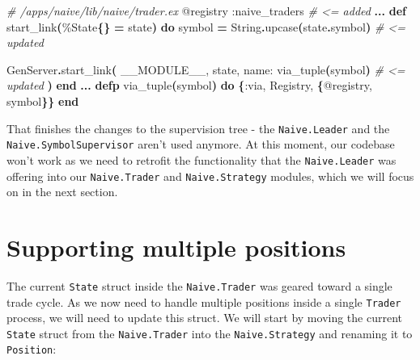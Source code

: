 \documentclass[
  oneside]{book}
\newenvironment{Shaded}{\begin{snugshade}}{\end{snugshade}}
\newcommand{\CommentTok}[1]{\textcolor[rgb]{0.56,0.35,0.01}{\textit{#1}}}
\newcommand{\ConstantTok}[1]{\textcolor[rgb]{0.56,0.35,0.01}{#1}}
\newcommand{\FunctionTok}[1]{\textcolor[rgb]{0.13,0.29,0.53}{\textbf{#1}}}
\newcommand{\KeywordTok}[1]{\textcolor[rgb]{0.13,0.29,0.53}{\textbf{#1}}}
\newcommand{\NormalTok}[1]{#1}
\newcommand{\OperatorTok}[1]{\textcolor[rgb]{0.81,0.36,0.00}{\textbf{#1}}}
\newcommand{\OtherTok}[1]{\textcolor[rgb]{0.56,0.35,0.01}{#1}}
\newcommand{\VariableTok}[1]{\textcolor[rgb]{0.00,0.00,0.00}{#1}}
\begin{document}
\begin{Shaded}
\begin{Highlighting}[]
  \CommentTok{\# /apps/naive/lib/naive/trader.ex}
  \OtherTok{@registry} \VariableTok{:naive\_traders} \CommentTok{\# \textless{}= added}
  \OperatorTok{...}
  \KeywordTok{def}\NormalTok{ start\_link}\FunctionTok{(}\NormalTok{\%}\ConstantTok{State}\FunctionTok{\{\}} \OperatorTok{=}\NormalTok{ state}\FunctionTok{)} \KeywordTok{do}
\NormalTok{    symbol }\OperatorTok{=} \ConstantTok{String}\OperatorTok{.}\NormalTok{upcase}\FunctionTok{(}\NormalTok{state}\OperatorTok{.}\NormalTok{symbol}\FunctionTok{)} \CommentTok{\# \textless{}= updated}

    \ConstantTok{GenServer}\OperatorTok{.}\NormalTok{start\_link}\FunctionTok{(}
      \ConstantTok{\_\_MODULE\_\_}\NormalTok{,}
\NormalTok{      state,}
      \VariableTok{name:}\NormalTok{ via\_tuple}\FunctionTok{(}\NormalTok{symbol}\FunctionTok{)}  \CommentTok{\# \textless{}= updated}
    \FunctionTok{)}
  \KeywordTok{end}
  \OperatorTok{...}
  \KeywordTok{defp}\NormalTok{ via\_tuple}\FunctionTok{(}\NormalTok{symbol}\FunctionTok{)} \KeywordTok{do}
    \FunctionTok{\{}\VariableTok{:via}\NormalTok{, }\ConstantTok{Registry}\NormalTok{, }\FunctionTok{\{}\OtherTok{@registry}\NormalTok{, symbol}\FunctionTok{\}\}}
  \KeywordTok{end}
\end{Highlighting}
\end{Shaded}

That finishes the changes to the supervision tree - the \texttt{Naive.Leader} and the \texttt{Naive.SymbolSupervisor} aren't used anymore. At this moment, our codebase won't work as we need to retrofit the functionality that the \texttt{Naive.Leader} was offering into our \texttt{Naive.Trader} and \texttt{Naive.Strategy} modules, which we will focus on in the next section.

\section{Supporting multiple positions}\label{supporting-multiple-positions}

The current \texttt{State} struct inside the \texttt{Naive.Trader} was geared toward a single trade cycle. As we now need to handle multiple positions inside a single \texttt{Trader} process, we will need to update this struct. We will start by moving the current \texttt{State} struct from the \texttt{Naive.Trader} into the \texttt{Naive.Strategy} and renaming it to \texttt{Position}:
\end{document}
